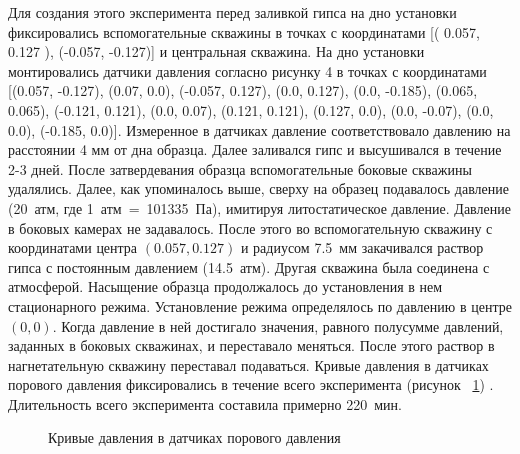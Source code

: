 Для создания этого эксперимента перед заливкой гипса на дно установки фиксировались вспомогательные скважины в точках с координатами [( 0.057, 0.127 ), (-0.057, -0.127)] и центральная скважина. На дно установки монтировались датчики давления согласно рисунку 4 в точках с координатами [(0.057, -0.127), (0.07, 0.0), (-0.057, 0.127), (0.0, 0.127), (0.0, -0.185), (0.065, 0.065), (-0.121, 0.121), (0.0, 0.07), (0.121, 0.121), (0.127, 0.0), (0.0, -0.07), (0.0, 0.0), (-0.185, 0.0)].  Измеренное в датчиках давление соответствовало давлению на расстоянии 4 мм от дна образца. Далее заливался гипс и высушивался в течение 2-3 дней. После затвердевания образца вспомогательные боковые скважины удалялись. Далее, как упоминалось выше, сверху на образец подавалось давление (20~атм, где 1~атм~=~101335~Па), имитируя литостатическое давление. Давление в боковых камерах не задавалось. После этого во вспомогательную скважину с координатами центра $(0.057, 0.127 )$ и радиусом 7.5~мм закачивался раствор гипса с постоянным давлением (14.5~атм). Другая скважина была соединена с атмосферой. Насыщение образца продолжалось до установления в нем стационарного режима. Установление режима определялось по давлению в  центре $(0, 0)$. Когда давление в ней достигало значения, равного полусумме давлений, заданных в боковых скважинах, и переставало меняться. После этого раствор в нагнетательную скважину переставал подаваться. Кривые давления в датчиках порового давления фиксировались в течение всего эксперимента (рисунок ~\ref{device4:pict}) . Длительность всего эксперимента составила примерно 220~мин. 

\begin{figure}[hb]
\begin{center}
\end{center}
\caption{Кривые давления в датчиках порового давления}\label{device4:pict}
\end{figure}



